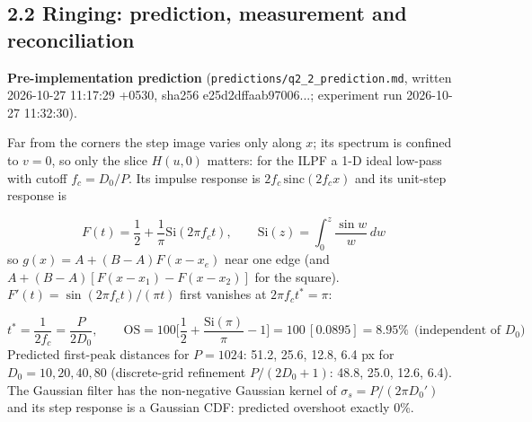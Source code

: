 \documentclass[10pt,a4paper]{article}
\begin{document}
\subsection{2.2 Ringing: prediction, measurement and reconciliation}
\textbf{Pre-implementation prediction} (\texttt{predictions/\allowbreak{}q2\_\allowbreak{}2\_\allowbreak{}prediction.\allowbreak{}md}, written 2026-10-27 11:17:29 +0530, sha256 e25d2dffaab97006...; experiment run 2026-10-27 11:32:30).

Far from the corners the step image varies only along $x$; its spectrum is confined to $v=0$, so only the slice $H(u,0)$ matters: for the ILPF a 1-D ideal low-pass with cutoff $f_c=D_0/P$. Its impulse response is $2f_c\,\mathrm{sinc}(2f_cx)$ and its unit-step response is

\begin{equation}F(t)=\frac12+\frac{1}{\pi}\mathrm{Si}(2\pi f_c t),\qquad \mathrm{Si}(z)=\int_0^z\frac{\sin w}{w}\,dw\end{equation}
so $g(x)=A+(B-A)F(x-x_e)$ near one edge (and $A+(B-A)[F(x-x_1)-F(x-x_2)]$ for the square). $F'(t)=\sin(2\pi f_ct)/(\pi t)$ first vanishes at $2\pi f_c t^*=\pi$:

\begin{equation}t^{*}=\frac{1}{2f_c}=\frac{P}{2D_0},\qquad \mathrm{OS}=100\Big[\frac12+\frac{\mathrm{Si}(\pi)}{\pi}-1\Big]=100\,[0.0895]=8.95\%\ \ \text{(independent of }D_0)\end{equation}
Predicted first-peak distances for $P=1024$: 51.2, 25.6, 12.8, 6.4 px for $D_0=10,20,40,80$ (discrete-grid refinement $P/(2D_0+1)$: 48.8, 25.0, 12.6, 6.4). The Gaussian filter has the non-negative Gaussian kernel of $\sigma_s=P/(2\pi D_0')$ and its step response is a Gaussian CDF: predicted overshoot exactly 0\%.
\end{document}
